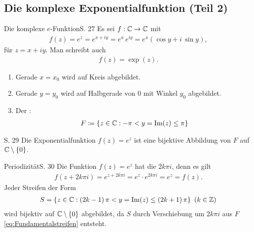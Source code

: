 \subsection{Die komplexe Exponentialfunktion (Teil 2)}

\begin{bemerkung}{Die komplexe $e$-Funktion}{S. 27}
  Es sei $f : \mathbb{C} \to \mathbb{C}$ mit
  \begin{align}
    f(z) = e^z = e^{x+iy} = e^x \, e^{iy} = e^x \left( \cos y + i \, \sin y \right) ,
  \end{align}
  für $z = x + iy$.
  Man schreibt auch
  \begin{align}
    f(z) = \operatorname{exp}(z) .
  \end{align}
  \begin{enumerate}
    \item Gerade $x = x_0$ wird auf Kreis abgebildet.
    \item Gerade $y = y_0$ wird auf Halbgerade von $0$ mit Winkel $y_0$ abgebildet.
    \item Der :
      \begin{align}
        \label{eq:Fundamentalstreifen}
        F \coloneqq \left\{ z \in \mathbb{C} : -\pi < y = \operatorname{Im}(z) \leq \pi \right\}
      \end{align}
  \end{enumerate}
\end{bemerkung}

\begin{satz}{S. 29}
  Die Exponentialfunktion $f(z) = e^z$ ist eine bijektive Abbildung von $F$ auf $\mathbb{C} \setminus \{ 0 \}$.
\end{satz}

\begin{bemerkung}{Periodizität}{S. 30}
  Die Funktion $f(z) = e^z$ hat die  $2 k \pi i$, denn es gilt
  \begin{align}
    f(z + 2 k \pi i) = e^{z + 2 k \pi i} = e^z \cdot e^{2 k \pi i} = e^z = f(z) .
  \end{align}
  Jeder Streifen der Form
  \begin{align}
    S = \left\{ z \in \mathbb{C} : (2k-1)\,\pi < y = \operatorname{Im}(z) \leq (2k+1)\,\pi \right\} \ (k \in \mathbb{Z})
  \end{align}
  wird bijektiv auf $\mathbb{C} \setminus \{ 0 \}$ abgebildet, da $S$ durch Verschiebung um $2 k \pi i$ aus $F$ \eqref{eq:Fundamentalstreifen} entsteht.
\end{bemerkung}



